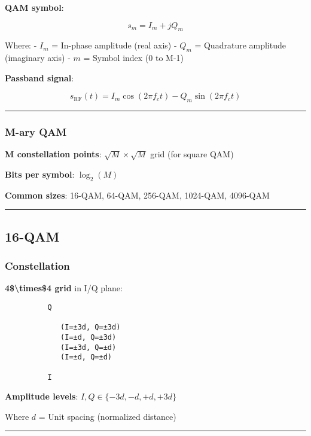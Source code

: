 \textbf{QAM symbol}:

\[
s_m = I_m + jQ_m
\]

Where: - \(I_m\) = In-phase amplitude (real axis) - \(Q_m\) = Quadrature
amplitude (imaginary axis) - \(m\) = Symbol index (0 to M-1)

\textbf{Passband signal}:

\[
s_{\text{RF}}(t) = I_m \cos(2\pi f_c t) - Q_m \sin(2\pi f_c t)
\]

\begin{center}\rule{0.5\linewidth}{0.5pt}\end{center}

\subsubsection{M-ary QAM}\label{m-ary-qam}

\textbf{M constellation points}: \(\sqrt{M} \times \sqrt{M}\) grid (for
square QAM)

\textbf{Bits per symbol}: \(\log_2(M)\)

\textbf{Common sizes}: 16-QAM, 64-QAM, 256-QAM, 1024-QAM, 4096-QAM

\begin{center}\rule{0.5\linewidth}{0.5pt}\end{center}

\subsection{16-QAM}\label{qam}

\subsubsection{Constellation}\label{constellation}

\textbf{4\$\textbackslash times\$4 grid} in I/Q plane:

\begin{verbatim}
          Q
          
             (I=±3d, Q=±3d)
             (I=±d, Q=±3d)
             (I=±3d, Q=±d)
             (I=±d, Q=±d)
          
          I
\end{verbatim}

\textbf{Amplitude levels}: \(I, Q \in \{-3d, -d, +d, +3d\}\)

Where \(d\) = Unit spacing (normalized distance)

\begin{center}\rule{0.5\linewidth}{0.5pt}\end{center}


